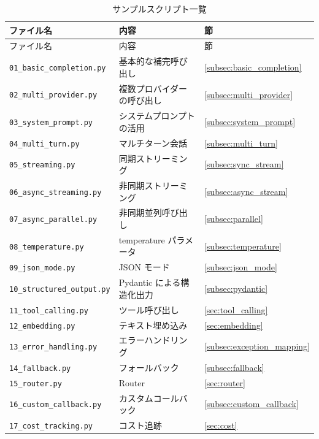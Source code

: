 \documentclass[a4paper,11pt]{ltjsarticle}
\newcommand{\code}[1]{\texttt{#1}}
\begin{document}
\begin{longtable}{lp{7cm}l}
\caption{サンプルスクリプト一覧}
\label{tab:scripts} \\
\toprule
ファイル名 & 内容 & 節 \\
\midrule
\endfirsthead
\toprule
ファイル名 & 内容 & 節 \\
\midrule
\endhead
\code{01\_basic\_completion.py}   & 基本的な補完呼び出し         & \ref{subsec:basic_completion} \\
\code{02\_multi\_provider.py}     & 複数プロバイダーの呼び出し    & \ref{subsec:multi_provider} \\
\code{03\_system\_prompt.py}      & システムプロンプトの活用       & \ref{subsec:system_prompt} \\
\code{04\_multi\_turn.py}         & マルチターン会話              & \ref{subsec:multi_turn} \\
\code{05\_streaming.py}           & 同期ストリーミング            & \ref{subsec:sync_stream} \\
\code{06\_async\_streaming.py}    & 非同期ストリーミング          & \ref{subsec:async_stream} \\
\code{07\_async\_parallel.py}     & 非同期並列呼び出し            & \ref{subsec:parallel} \\
\code{08\_temperature.py}         & temperature パラメータ       & \ref{subsec:temperature} \\
\code{09\_json\_mode.py}          & JSON モード                  & \ref{subsec:json_mode} \\
\code{10\_structured\_output.py}  & Pydantic による構造化出力     & \ref{subsec:pydantic} \\
\code{11\_tool\_calling.py}       & ツール呼び出し               & \ref{sec:tool_calling} \\
\code{12\_embedding.py}           & テキスト埋め込み             & \ref{sec:embedding} \\
\code{13\_error\_handling.py}     & エラーハンドリング            & \ref{subsec:exception_mapping} \\
\code{14\_fallback.py}            & フォールバック               & \ref{subsec:fallback} \\
\code{15\_router.py}              & Router                      & \ref{sec:router} \\
\code{16\_custom\_callback.py}    & カスタムコールバック          & \ref{subsec:custom_callback} \\
\code{17\_cost\_tracking.py}      & コスト追跡                   & \ref{sec:cost} \\

\end{longtable}
\end{document}
